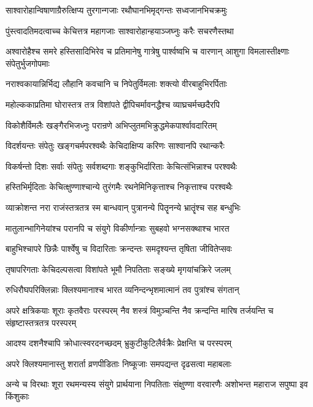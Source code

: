 \twolineshloka
{साश्वारोहान्विषाणाग्रैरुत्क्षिप्य तुरगान्गजाः}
{रथौघानभिमृद्गन्तः सध्वजानभिचक्रमुः}


\twolineshloka
{पुंस्त्वादतिमदत्वाच्च केचित्तत्र महागजाः}
{साश्वारोहान्हयाञ्जघ्नुः करैः सचरणैस्तथा}


\threelineshloka
{अश्वारोहैश्च समरे हस्तिसादिभिरेव च}
{प्रतिमानेषु गात्रेषु पार्श्वष्वभि च वारणान्}
{आशुगा विमलास्तीक्ष्णाः संपेतुर्भुजगोपमाः}


\twolineshloka
{नराश्वकायान्निर्भिद्य लौहानि कवचानि च}
{निपेतुर्विमलाः शक्त्यो वीरबाहुभिरर्पिताः}


\twolineshloka
{महोल्ककाप्रतिमा घोरास्तत्र तत्र विशांपते}
{द्वीपिचर्मावनद्धैश्च व्याघ्रचर्मच्छदैरपि}


\twolineshloka
{विकोशैर्विमलैः खङ्गैरभिजध्नुः परान्रणे}
{अभिप्लुतमभिक्रुद्धमेकपार्श्वावदारितम्}


\twolineshloka
{विदर्शयन्तः संपेतुः खङ्गचर्मपरश्वथैः}
{केचिदाक्षिप्य करिणः साश्वानपि रथान्करैः}


\twolineshloka
{विकर्षन्तो दिशः सर्वाः संपेतुः सर्वशब्दगाः}
{शङ्कुभिर्दारिताः केचित्संभिन्नाश्च परश्वथैः}


\twolineshloka
{हस्तिभिर्मृदिताः केचित्क्षुण्णाश्चान्ये तुरंगमैः}
{रथनेमिनिकृत्ताश्च निकृत्ताश्च परश्वथैः}


\twolineshloka
{व्याक्रोशन्त नरा राजंस्तत्रतत्र स्म बान्धवान्}
{पुत्रानन्ये पितॄनन्ये भ्रातॄंश्च सह बन्धुभिः}


\twolineshloka
{मातुलान्भागिनेयांश्च परानपि च संयुगे}
{विकीर्णान्त्राः सुबहवो भग्नसक्थाश्च भारत}


\twolineshloka
{बाहुभिश्चापरे छिन्नैः पार्श्वेषु च विदारिताः}
{क्रन्दन्तः समदृश्यन्त तृषिता जीवितेप्सवः}


\twolineshloka
{तृषापरिगताः केचिदल्पसत्वा विशांपते}
{भूमौ निपतिताः सङ्ख्ये मृगयांचक्रिरे जलम्}


\twolineshloka
{रुधिरौघपरिक्लिन्नाः क्लिश्यमानाश्च भारत}
{व्यनिन्दन्भृशमात्मानं तव पुत्रांश्च संगतान्}


\threelineshloka
{अपरे क्षत्रिकयाः शूराः कृतवैराः परस्परम्}
{नैव शस्त्रं विमुञ्चन्ति नैव क्रन्दन्ति मारिष}
{तर्जयन्ति च संहृष्टास्तत्रतत्र परस्परम्}


\twolineshloka
{आदश्य दशनैश्चापि क्रोधात्स्वरदनच्छदम्}
{भ्रुकुटीकुटिलैर्वक्रैः प्रेक्षन्ति च परस्परम्}


\twolineshloka
{अपरे क्लिश्यमानास्तु शरार्ता व्रणपीडिताः}
{निष्कूजाः समपद्यन्त दृढसत्वा महाबलाः}


\threelineshloka
{अन्ये च विरथाः शूरा रथमन्यस्य संयुगे}
{प्रार्थयाना निपतिताः संक्षुण्णा वरवारणैः}
{अशोभन्त महाराज सपुष्पा इव किंशुकाः}


